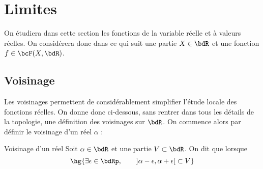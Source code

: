 \documentclass[a4paper,french,bookmarks]{article}
\begin{document}
\section{Limites}

On étudiera dans cette section les fonctions de la variable réelle et à valeurs réelles. On considérera donc dans ce qui suit une partie $X \in \bdR$ et une fonction $f \in \bcF(X, \bdR)$.

\subsection{Voisinage}

Les voisinages permettent de considérablement simplifier l'étude locale des fonctions réelles. On donne donc ci-dessous, sans rentrer dans tous les détails de la topologie, une définition des voisinages sur $\bdR$. On commence alors par définir le voisinage d'un réel $\alpha$ :

\begin{definition}{Voisinage d'un réel}{}
    Soit $\alpha \in \bdR$ et une partie $V \subset \bdR$. On dit que  lorsque
    \[\hg{\exists \epsilon \in \bdRp, \qquad \left]\alpha - \epsilon, \alpha + \epsilon\right[ \subset V}\]
\end{definition}
\end{document}
